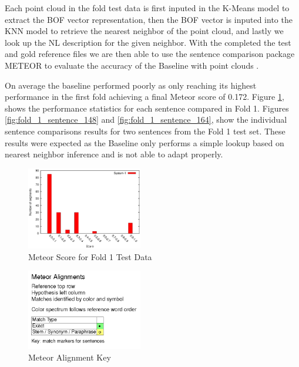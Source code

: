 \documentclass[letterpaper, 12 pt, conference]{ieeeconf}
\begin{document}
Each point cloud in the fold test data is first inputed in the K-Means model to extract the BOF vector representation, then the BOF vector is inputed into the KNN model to retrieve the nearest neighbor of the point cloud, and lastly we look up the NL description for the given neighbor. With the completed the test and gold reference files we are then able to use the sentence comparison package METEOR to evaluate the accuracy of the Baseline with point clouds \cite{Denkowski14meteoruniversal}.

On average the baseline performed poorly as only reaching its highest performance in the first fold achieving a final Meteor score of 0.172. Figure \ref{fig:fold_1_score}, shows the performance statistics for each sentence compared in Fold 1. Figures \ref{fig:fold_1_sentence_148} and \ref{fig:fold_1_sentence_164}, show the individual sentence comparisons results for two sentences from the Fold 1 test set. These results were expected as the Baseline only performs a simple lookup based on nearest neighbor inference and is not able to adapt properly.

\begin{figure}[htb!]
  \centering
  \includegraphics[width=0.45\textwidth]{fold_1_score}
  \caption{Meteor Score for Fold 1 Test Data}
  \label{fig:fold_1_score}
\end{figure}

\begin{figure}[htb!]
  \centering
  \includegraphics[width=0.45\textwidth]{meteor_alignment_key}
  \caption{Meteor Alignment Key}
  \label{fig:meteor_alignment_key}
\end{figure}
\end{document}
